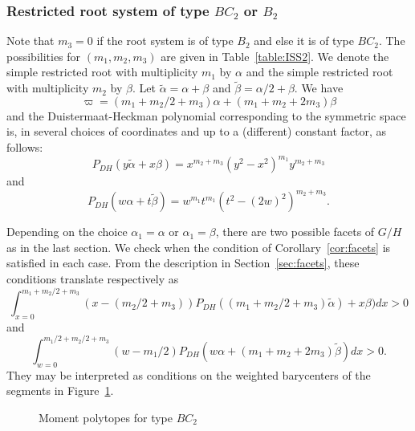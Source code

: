 \documentclass[10pt]{amsart}
\theoremstyle{plain}
\theoremstyle{definition}
\begin{document}
\subsubsection{Restricted root system of type $BC_2$ or $B_2$}

Note that $m_3=0$ if the root system is of type $B_2$ and else
it is of type $BC_2$.
The possibilities for $(m_1,m_2,m_3)$ are given in Table~\ref{table:ISS2}.
We denote the simple restricted root with multiplicity $m_1$ by $\alpha$
and the simple restricted root with multiplicity $m_2$ by $\beta$.
Let $\tilde{\alpha}= \alpha+\beta$ and
$\tilde{\beta}= \alpha/2+\beta$.
We have
\[ \varpi = (m_1+m_2/2+m_3)\alpha+(m_1+m_2+2m_3)\beta \]
and the Duistermaat-Heckman polynomial corresponding to the
symmetric space is, in several choices
of coordinates and up to a (different) constant factor, as follows:
\begin{equation*}
P_{DH}(y\tilde{\alpha}+x\beta)= x^{m_2+m_3}(y^2-x^2)^{m_1}y^{m_2+m_3}
\end{equation*}
and
\begin{equation*}
P_{DH}(w\alpha+t\tilde{\beta})=w^{m_1}t^{m_1}(t^2-(2w)^2)^{m_2+m_3}.
\end{equation*}

Depending on the choice $\alpha_1=\alpha$ or $\alpha_1=\beta$,
there are two possible facets of $G/H$ as in the last section.
We check when the condition of Corollary~\ref{cor:facets} is satisfied
in each case.
From the description in Section~\ref{sec:facets}, these conditions translate
respectively as
\begin{equation*}
\int_{x=0}^{m_1+m_2/2+m_3}
(x-(m_2/2+m_3))
P_{DH}((m_1+m_2/2+m_3)\tilde{\alpha})+x\beta)dx
>0
\end{equation*}
and
\begin{equation*}
\int_{w=0}^{m_1/2+m_2/2+m_3}
(w-m_1/2)
P_{DH}(w\alpha+(m_1+m_2+2m_3)\tilde{\beta})dx
>0.
\end{equation*}
They may be interpreted as conditions on the weighted barycenters of the segments
in Figure~\ref{fig:BC2pol}.

\begin{figure}
\smaller\centering
{}
\caption{Moment polytopes for type $BC_2$}
\label{fig:BC2pol}
\end{figure}
\end{document}
